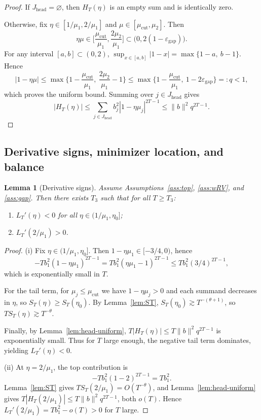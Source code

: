\documentclass[11pt]{article}
\newtheorem{lemma}{Lemma}
\begin{document}
\begin{proof}
If $J_{\mathrm{head}}=\varnothing$, then $H_T(\eta)$ is an empty sum and is identically zero.

Otherwise, fix $\eta\in[1/\mu_1,2/\mu_1]$ and $\mu\in[\mu_{\mathrm{cut}},\mu_2]$. Then
\[
\eta\mu\in\Big[\frac{\mu_{\mathrm{cut}}}{\mu_1},\frac{2\mu_2}{\mu_1}\Big]
\subset \Big(0,2(1-\varepsilon_{\mathrm{gap}})\Big).
\]
For any interval $[a,b]\subset(0,2)$,
$\sup_{x\in[a,b]}|1-x|=\max\{1-a,\ b-1\}$. Hence
\[
|1-\eta\mu|
\le
\max\Big\{1-\frac{\mu_{\mathrm{cut}}}{\mu_1},\ \frac{2\mu_2}{\mu_1}-1\Big\}
\le
\max\Big\{1-\frac{\mu_{\mathrm{cut}}}{\mu_1},\ 1-2\varepsilon_{\mathrm{gap}}\Big\}
=:q<1,
\]
which proves the uniform bound. Summing over $j\in J_{\mathrm{head}}$ gives
\[
|H_T(\eta)|
\le \sum_{j\in J_{\mathrm{head}}} b_j^2 |1-\eta\mu_j|^{2T-1}
\le \|b\|^2 q^{2T-1}.
\]
\end{proof}

\subsection{Derivative signs, minimizer location, and balance}

\begin{lemma}[Derivative signs]\label{lem:signs}
Assume Assumptions~\ref{ass:top}, \ref{ass:wRV}, and \ref{ass:gap}. Then there exists $T_3$ such that for all $T\ge T_3$:
\begin{enumerate}[label=(\roman*),leftmargin=*]
\item $L_T'(\eta)<0$ for all $\eta\in(1/\mu_1,\eta_0]$;
\item $L_T'(2/\mu_1)>0$.
\end{enumerate}
\end{lemma}

\begin{proof}
(i) Fix $\eta\in(1/\mu_1,\eta_0]$. Then $1-\eta\mu_1\in[-3/4,0)$, hence
\[
-T b_1^2(1-\eta\mu_1)^{2T-1}=T b_1^2(\eta\mu_1-1)^{2T-1}
\le T b_1^2(3/4)^{2T-1},
\]
which is exponentially small in $T$.

For the tail term, for $\mu_j\le\mu_{\mathrm{cut}}$ we have $1-\eta\mu_j>0$ and each summand
decreases in $\eta$, so $S_T(\eta)\ge S_T(\eta_0)$. By Lemma~\ref{lem:ST}, $S_T(\eta_0)\gtrsim T^{-(\theta+1)}$,
so $T S_T(\eta)\gtrsim T^{-\theta}$.

Finally, by Lemma~\ref{lem:head-uniform}, $T|H_T(\eta)|\le T\|b\|^2 q^{2T-1}$ is exponentially small.
Thus for $T$ large enough, the negative tail term dominates, yielding $L_T'(\eta)<0$.

(ii) At $\eta=2/\mu_1$, the top contribution is
\[
-T b_1^2(1-2)^{2T-1}=T b_1^2.
\]
Lemma~\ref{lem:ST} gives $T S_T(2/\mu_1)=O(T^{-\theta})$, and Lemma~\ref{lem:head-uniform} gives
$T|H_T(2/\mu_1)|\le T\|b\|^2 q^{2T-1}$, both $o(T)$. Hence $L_T'(2/\mu_1)=T b_1^2-o(T)>0$ for $T$ large.
\end{proof}
\end{document}
